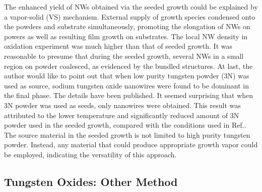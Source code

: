 The enhanced yield of NWs obtained via the seeded growth could be explained by a vapor-solid (VS) mechanism. External supply of growth species condensed onto the powders and substrate simultaneously, promoting the elongation of NWs on powers as well as resulting film growth on substrates. The local NW density in oxidation experiment was much higher than that of seeded growth. It was reasonable to presume that during the seeded growth, several NWs in a small region on powder coalesced, as evidenced by the bundled structures. At last, the author would like to point out that when low purity tungsten powder (3N) was used as source, sodium tungsten oxide nanowires were found to be dominant in the final phase. The details have been published.\cite{Sheng2014} It seemed surprising that when 3N powder was used as seeds, only  nanowires were obtained. This result was attributed to the lower temperature and significantly reduced amount of 3N powder used in the seeded growth, compared with the conditions used in Ref.\cite{Sheng2014}. The source material in the seeded growth is not limited to high purity tungsten powder. Instead, any material that could produce appropriate growth vapor could be employed, indicating the versatility of this approach.

\subsection{Tungsten Oxides: Other Method}

